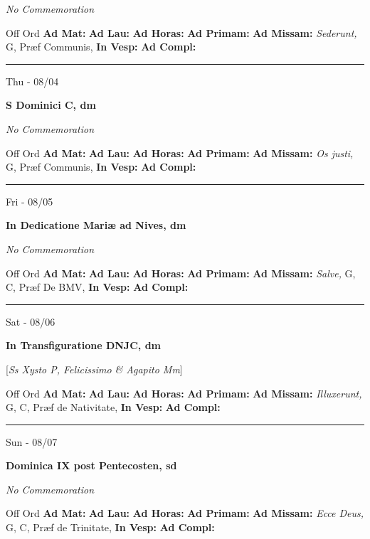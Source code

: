 \documentclass[letterpaper, 10pt]{article}
\begin{document}
\textit{No Commemoration}\begin{justify}
Off Ord
\textbf{Ad Mat: }
\textbf{Ad Lau: }
\textbf{Ad Horas: }
\textbf{Ad Primam: }
\textbf{Ad Missam:} \textit{Sederunt, } G, Præf Communis, 
\textbf{In Vesp: }
\textbf{Ad Compl: }\end{justify}



\hrule
\begin{center}
Thu - 08/04
\end{center}\textbf{ \large S Dominici C, \textnormal{\normalsize dm}}

\textit{No Commemoration}\begin{justify}
Off Ord
\textbf{Ad Mat: }
\textbf{Ad Lau: }
\textbf{Ad Horas: }
\textbf{Ad Primam: }
\textbf{Ad Missam:} \textit{Os justi, } G, Præf Communis, 
\textbf{In Vesp: }
\textbf{Ad Compl: }\end{justify}



\hrule
\begin{center}
Fri - 08/05
\end{center}\textbf{ \large In Dedicatione Mariæ ad Nives, \textnormal{\normalsize dm}}

\textit{No Commemoration}\begin{justify}
Off Ord
\textbf{Ad Mat: }
\textbf{Ad Lau: }
\textbf{Ad Horas: }
\textbf{Ad Primam: }
\textbf{Ad Missam:} \textit{Salve, } G, C, Præf De BMV, 
\textbf{In Vesp: }
\textbf{Ad Compl: }\end{justify}



\hrule
\begin{center}
Sat - 08/06
\end{center}\textbf{ \large In Transfiguratione DNJC, \textnormal{\normalsize dm}}

[\textit{Ss Xysto P, Felicissimo \& Agapito Mm}]
\begin{justify}
Off Ord
\textbf{Ad Mat: }
\textbf{Ad Lau: }
\textbf{Ad Horas: }
\textbf{Ad Primam: }
\textbf{Ad Missam:} \textit{Illuxerunt, } G, C, Præf de Nativitate, 
\textbf{In Vesp: }
\textbf{Ad Compl: }\end{justify}



\hrule
\begin{center}
Sun - 08/07
\end{center}\textbf{ \large Dominica IX post Pentecosten, \textnormal{\normalsize sd}}

\textit{No Commemoration}\begin{justify}
Off Ord
\textbf{Ad Mat: }
\textbf{Ad Lau: }
\textbf{Ad Horas: }
\textbf{Ad Primam: }
\textbf{Ad Missam:} \textit{Ecce Deus, } G, C, Præf de Trinitate, 
\textbf{In Vesp: }
\textbf{Ad Compl: }\end{justify}
\end{document}
